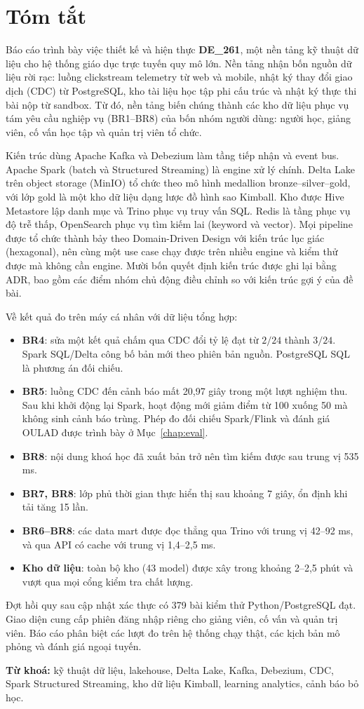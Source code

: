 \section*{Tóm tắt}

Báo cáo trình bày việc thiết kế và hiện thực \textbf{DE\_261}, một nền tảng kỹ thuật dữ liệu cho hệ thống giáo dục trực tuyến quy mô lớn. Nền tảng nhận bốn nguồn dữ liệu rời rạc: luồng clickstream telemetry từ web và mobile, nhật ký thay đổi giao dịch (CDC) từ PostgreSQL, kho tài liệu học tập phi cấu trúc và nhật ký thực thi bài nộp từ sandbox. Từ đó, nền tảng biến chúng thành các kho dữ liệu phục vụ tám yêu cầu nghiệp vụ (BR1--BR8) của bốn nhóm người dùng: người học, giảng viên, cố vấn học tập và quản trị viên tổ chức.

Kiến trúc dùng Apache Kafka và Debezium làm tầng tiếp nhận và event bus. Apache Spark (batch và Structured Streaming) là engine xử lý chính. Delta Lake trên object storage (MinIO) tổ chức theo mô hình medallion bronze--silver--gold, với lớp gold là một kho dữ liệu dạng lược đồ hình sao Kimball. Kho được Hive Metastore lập danh mục và Trino phục vụ truy vấn SQL. Redis là tầng phục vụ độ trễ thấp, OpenSearch phục vụ tìm kiếm lai (keyword và vector). Mọi pipeline được tổ chức thành bảy  theo Domain-Driven Design với kiến trúc lục giác (hexagonal), nên cùng một use case chạy được trên nhiều engine và kiểm thử được mà không cần engine. Mười bốn quyết định kiến trúc được ghi lại bằng ADR, bao gồm các điểm nhóm chủ động điều chỉnh so với kiến trúc gợi ý của đề bài.

Về kết quả đo trên máy cá nhân với dữ liệu tổng hợp:
\begin{itemize}
  \item \textbf{BR4}: sửa một kết quả chấm qua CDC đổi tỷ lệ đạt từ $2/24$ thành $3/24$. Spark SQL/Delta công bố bản mới theo phiên bản nguồn. PostgreSQL SQL là phương án đối chiếu.
  \item \textbf{BR5}: luồng CDC đến cảnh báo mất 20{,}97 giây trong một lượt nghiệm thu. Sau khi khởi động lại Spark, hoạt động mới giảm điểm từ 100 xuống 50 mà không sinh cảnh báo trùng. Phép đo đối chiếu Spark/Flink và đánh giá OULAD được trình bày ở Mục~\ref{chap:eval}.
  \item \textbf{BR8}: nội dung khoá học đã xuất bản trở nên tìm kiếm được sau trung vị 535 ms.
  \item \textbf{BR7, BR8}: lớp phủ thời gian thực hiển thị sau khoảng 7 giây, ổn định khi tải tăng 15 lần.
  \item \textbf{BR6--BR8}: các data mart được đọc thẳng qua Trino với trung vị 42--92 ms, và qua API có cache với trung vị 1{,}4--2{,}5 ms.
  \item \textbf{Kho dữ liệu}: toàn bộ kho (43 model) được xây trong khoảng 2--2{,}5 phút và vượt qua mọi cổng kiểm tra chất lượng.
\end{itemize}
Đợt hồi quy sau cập nhật xác thực có 379 bài kiểm thử Python/PostgreSQL đạt. Giao diện cung cấp phiên đăng nhập riêng cho giảng viên, cố vấn và quản trị viên. Báo cáo phân biệt các lượt đo trên hệ thống chạy thật, các kịch bản mô phỏng và đánh giá ngoại tuyến.

\vspace{6pt}
\textbf{Từ khoá:} kỹ thuật dữ liệu, lakehouse, Delta Lake, Kafka, Debezium, CDC, Spark Structured Streaming, kho dữ liệu Kimball, learning analytics, cảnh báo bỏ học.
